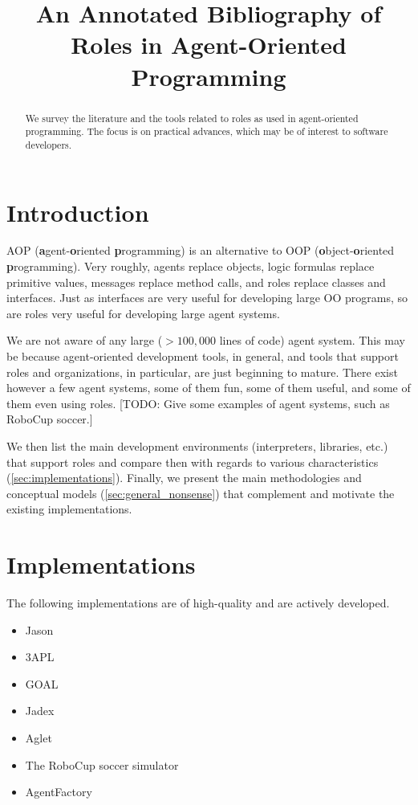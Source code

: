 \documentclass{article}
\title{An Annotated Bibliography of Roles in Agent-Oriented Programming}
\newcommand{\fb}[1]{\textbf{#1}}
\begin{document}
\maketitle
\begin{abstract}
We survey the literature and the tools related to roles as used in agent-oriented programming.
The focus is on practical advances, which may be of interest to software developers.
\end{abstract}

\section{Introduction}\label{sec:introduction} %

AOP (\fb agent-\fb oriented \fb programming) is an alternative to OOP (\fb object-\fb oriented \fb programming).
Very roughly, agents replace objects, logic formulas replace primitive values, messages replace method calls, and roles replace classes and interfaces.
Just as interfaces are very useful for developing large OO programs, so are roles very useful for developing large agent systems.

We are not aware of any large ($>100{,}000$ lines of code) agent system.
This may be because agent-oriented development tools, in general, and tools that support roles and organizations, in particular, are just beginning to mature.
There exist however a few agent systems, some of them fun, some of them useful, and some of them even using roles.
[TODO: Give some examples of agent systems, such as RoboCup soccer.]

We then list the main development environments (interpreters, libraries, etc.) that support roles and compare then with regards to various characteristics (\autoref{sec:implementations}).
Finally, we present the main methodologies and conceptual models (\autoref{sec:general_nonsense}) that complement and motivate the existing implementations.

\section{Implementations}\label{sec:implementations} %

The following implementations are of high-quality and are actively developed.
\begin{itemize}
\item Jason~\cite{books/sp/map2005/BordiniHV05}
\item 3APL~\cite{books/sp/map2005/DastaniRM05}
\item GOAL~\cite{hindriks2009programmingrationalagents}
\item Jadex~\cite{todo}
\item Aglet~\cite{todo}
\item The RoboCup soccer simulator
\item AgentFactory
\end{itemize}
\end{document}
